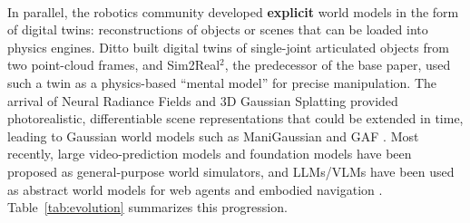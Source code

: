 \documentclass[12pt,a4paper,final]{extreport}
\begin{document}
\paragraph{} In parallel, the robotics community developed \textbf{explicit} world models in the form of digital twins: reconstructions of objects or scenes that can be loaded into physics engines. Ditto built digital twins of single-joint articulated objects from two point-cloud frames, and Sim2Real$^2$, the predecessor of the base paper, used such a twin as a physics-based ``mental model'' for precise manipulation. The arrival of Neural Radiance Fields and 3D Gaussian Splatting provided photorealistic, differentiable scene representations that could be extended in time, leading to Gaussian world models such as ManiGaussian and GAF \cite{p2}. Most recently, large video-prediction models and foundation models have been proposed as general-purpose world simulators, and LLMs/VLMs have been used as abstract world models for web agents and embodied navigation \cite{p4}. Table~\ref{tab:evolution} summarizes this progression.
\end{document}
